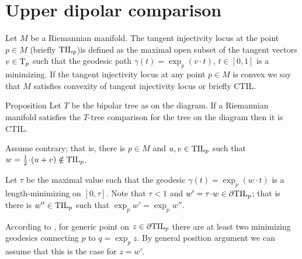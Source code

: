 \section{Upper dipolar comparison}

Let $M$ be a Riemannian manifold.
The tangent injectivity locus at the point $p\in M$ (briefly $\mathrm{\rm TIL}_p$)is defined as the maximal open subset of the tangent vectors $v\in\mathrm{T}_p$ such that the geodesic path $\gamma(t)=\exp_p(v\cdot t)$, $t\in [0,1]$ is a minimizing.
If the tangent injectivity locus at any point $p\in M$ is convex we say that $M$ satisfies convexity of  tangent injectivity locus or briefly CTIL.

{

\begin{wrapfigure}{r}{24 mm}
\end{wrapfigure}

\begin{thm}{Proposition}
Let $T$ be the bipolar tree as on the diagram.
If a Riemannian manifold satisfies the $T$-tree comparison for the tree on the diagram then it is CTIL.
\end{thm}

Assume contrary; that is, there is $p\in M$ and $u,v\zz\in \TIL_p$ such that $w=\tfrac12\cdot(u+v)\notin \TIL_p$.

}

Let $\tau$ be the maximal value such that the geodesic $\gamma(t)=\exp_p(w\cdot t)$ is a length-minimizing on $[0,\tau]$.
Note that $\tau<1$ and $w'=\tau\cdot w\in\partial \TIL_p$; that is there is $w''\in\mathrm{\rm TIL}_p$ such that $\exp_pw'=\exp_pw''$.



According to \cite{karcher}, for generic point on $z\in\partial \mathrm{\rm TIL}_p$ there are at least two minimizing geodesics connecting $p$ to $q=\exp_p z$.
By general position argument we can assume that this is the case for $z=w'$.

